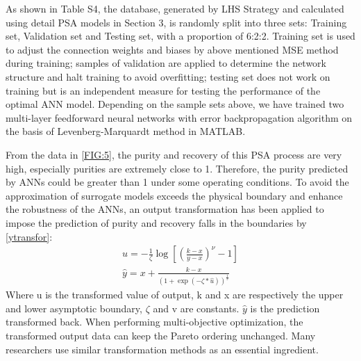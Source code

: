 \documentclass[preprint,12pt]{elsarticle}
\begin{document}
As shown in Table S4, the database, generated by LHS Strategy and calculated using detail PSA models in Section 3, is randomly split into three sets: Training set, Validation set and Testing set, with a proportion of 6:2:2. Training set is used to adjust the connection weights and biases by above mentioned MSE method during training; samples of validation are applied to determine the network structure and halt training to avoid overfitting; testing set does not work on training but is an independent measure for testing the performance of the optimal ANN model. Depending on the sample sets above, we have trained two multi-layer feedforward neural networks with error backpropagation algorithm on the basis of Levenberg-Marquardt method in MATLAB.

From the data in \cref{FIG:5}, the purity and recovery of this PSA process are very high, especially purities are extremely close to 1. Therefore, the purity predicted by ANNs could be greater than 1 under some operating conditions. To avoid the approximation of surrogate models exceeds the physical boundary and enhance the robustness of the ANNs, an output transformation has been applied to impose the prediction of purity and recovery falls in the boundaries by \cref{ytransfor}:
\begin{equation}
	\begin{array}{l}
		u =  - \frac{1}{\zeta }\log \left[ {{{\left( {\frac{{k - x}}{{y - x}}} \right)}^\nu } - 1} \right]\\
		\widehat y = x + \frac{{k - x}}{{{{(1 + \exp ( - \zeta  * \widehat u))}^{\frac{1}{v}}}}}
	\end{array}\label{ytransfor}
\end{equation}
Where u is the transformed value of output, k and x are respectively the upper and lower asymptotic boundary, $\zeta$ and v are constants. $\widehat y$ is the prediction transformed back. When performing multi-objective optimization, the transformed output data can keep the Pareto ordering unchanged\cite{RN32}. Many researchers use similar transformation methods as an essential ingredient\cite{RN29,RN32,RN54}.
\end{document}
